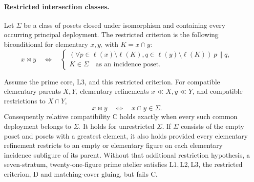 \paragraph{Restricted intersection classes.}
Let $\Sigma$ be a class of posets closed under isomorphism and
containing every occurring principal deployment. The restricted
criterion is the following biconditional for elementary $x,y$,
with $K=x\cap y$:
\[
 x\bowtie y\quad\Longleftrightarrow\quad
 \left\{\begin{array}{l}
 (\forall p\in\ell(x)\setminus\ell(K),q\in\ell(y)\setminus\ell(K))
       \ p\parallel q,\\
 K\in\Sigma\quad\text{as an incidence poset}.
 \end{array}\right.
\]
\begin{theorem}\label{thm:sigma}
Assume the prime core, $\mathrm L3$, and this restricted criterion.
For compatible elementary parents $X,Y$, elementary refinements
$x\ll X,y\ll Y$, and compatible restrictions to $X\cap Y$,
\[
 x\bowtie y\quad\Longleftrightarrow\quad x\cap y\in\Sigma.
\]
Consequently relative compatibility $\mathrm C$ holds exactly
when every such common deployment belongs to $\Sigma$.
It holds for unrestricted $\Sigma$. If $\Sigma$ consists of the
empty poset and posets with a greatest element, it also holds
provided every elementary refinement restricts to an empty or
elementary figure on each elementary incidence subfigure of its parent.
Without that additional restriction hypothesis, a seven-stratum,
twenty-one-figure prime atelier satisfies $\mathrm L1,\mathrm L2,
\mathrm L3$, the restricted criterion, $\mathrm D$ and matching-cover
gluing, but fails $\mathrm C$.
\end{theorem}

